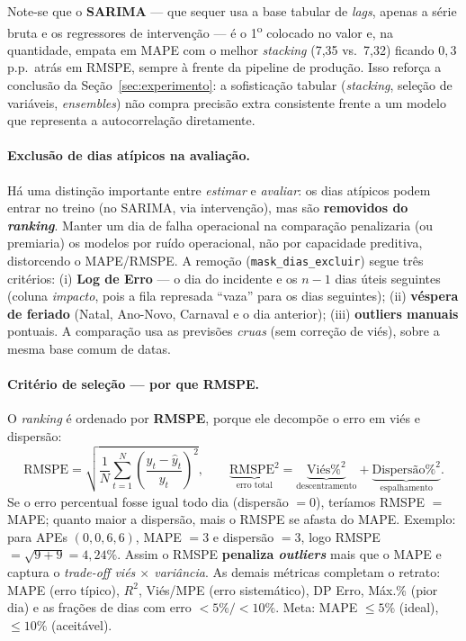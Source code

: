 \documentclass[11pt,a4paper]{article}
\begin{document}
Note-se que o \textbf{SARIMA} --- que sequer usa a base tabular de \emph{lags}, apenas a série
bruta e os regressores de intervenção --- é o 1\textsuperscript{o} colocado no valor e, na
quantidade, empata em MAPE com o melhor \emph{stacking} (7,35 vs.\ 7,32) ficando $0{,}3$ p.p.\
atrás em RMSPE, sempre à frente da pipeline de produção. Isso reforça a conclusão da
Seção~\ref{sec:experimento}: a sofisticação tabular (\emph{stacking}, seleção de variáveis,
\emph{ensembles}) não compra precisão extra consistente frente a um modelo que representa a
autocorrelação diretamente.

\paragraph{Exclusão de dias atípicos na avaliação.}
\label{sec:excluir}
Há uma distinção importante entre \emph{estimar} e \emph{avaliar}: os dias atípicos podem entrar no
treino (no SARIMA, via intervenção), mas são \textbf{removidos do \emph{ranking}}. Manter um dia de
falha operacional na comparação penalizaria (ou premiaria) os modelos por ruído operacional, não
por capacidade preditiva, distorcendo o MAPE/RMSPE. A remoção (\texttt{mask\_dias\_excluir}) segue
três critérios: (i) \textbf{Log de Erro} --- o dia do incidente e os $n-1$ dias úteis seguintes
(coluna \emph{impacto}, pois a fila represada ``vaza'' para os dias seguintes); (ii) \textbf{véspera
de feriado} (Natal, Ano-Novo, Carnaval e o dia anterior); (iii) \textbf{outliers manuais}
pontuais. A comparação usa as previsões \emph{cruas} (sem correção de viés), sobre a mesma base
comum de datas.

\paragraph{Critério de seleção --- por que RMSPE.} O \emph{ranking} é ordenado por \textbf{RMSPE},
porque ele decompõe o erro em viés e dispersão:
\begin{equation}
\text{RMSPE} = \sqrt{\frac{1}{N}\sum_{t=1}^{N}\!\left(\frac{y_t-\hat y_t}{y_t}\right)^{\!2}},
\qquad
\underbrace{\text{RMSPE}^2}_{\text{erro total}} = \underbrace{\text{Viés}\%^2}_{\text{descentramento}} + \underbrace{\text{Dispersão}\%^2}_{\text{espalhamento}}.
\label{eq:rmspe}
\end{equation}
Se o erro percentual fosse igual todo dia (dispersão $=0$), teríamos RMSPE $=$ MAPE; quanto maior a
dispersão, mais o RMSPE se afasta do MAPE. Exemplo: para APEs $(0,0,6,6)$, MAPE $=3$ e dispersão
$=3$, logo RMSPE $=\sqrt{9+9}=4{,}24\%$. Assim o RMSPE \textbf{penaliza \emph{outliers}} mais que o
MAPE e captura o \emph{trade-off viés $\times$ variância}. As demais métricas completam o retrato:
MAPE (erro típico), $R^2$, Viés/MPE (erro sistemático), DP Erro, Máx.\% (pior dia) e as frações de
dias com erro $<5\%/<10\%$. Meta: MAPE $\le 5\%$ (ideal), $\le 10\%$ (aceitável).
\end{document}
